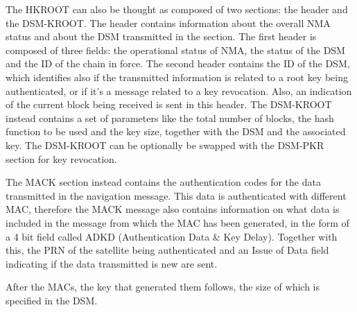 The HKROOT can also be thought as composed of two sections: the header and the
DSM-KROOT. The header contains information about the overall NMA status and
about the DSM transmitted in the section. The first header is composed of three
fields: the operational status of NMA, the status of the DSM and the ID of the
chain in force. The second header contains the ID of the DSM, which identifies
also if the transmitted information is related to a root key being
authenticated, or if it's a message related to a key revocation. Also, an
indication of the current block being received is sent in this header. The
DSM-KROOT instead contains a set of parameters like the total number of blocks,
the hash function to be used and the key size, together with the DSM and the
associated key. The DSM-KROOT can be optionally be swapped with the DSM-PKR
section for key revocation.


The MACK section instead contains the authentication codes for the data
transmitted in the navigation message. This data is authenticated with different
MAC, therefore the MACK message also contains information on what data is
included in the message from which the MAC has been generated, in the form of a
4 bit field called ADKD (Authentication Data \& Key Delay). Together with this,
the PRN of the satellite being authenticated and an Issue of Data field
indicating if the data transmitted is new are sent.

After the MACs, the key that generated them follows, the size of which is
specified in the DSM.



